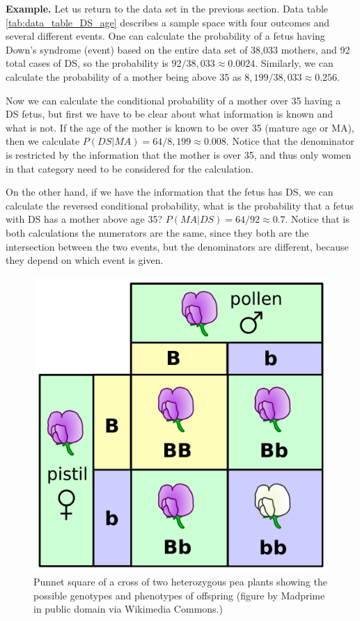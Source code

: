 \documentclass[
  letterpaper,
  DIV=11,
  numbers=noendperiod]{scrreprt}
\begin{document}
\textbf{Example.} Let us return to the data set in the previous section.
Data table \ref{tab:data_table_DS_age} describes a sample space with
four outcomes and several different events. One can calculate the
probability of a fetus having Down's syndrome (event) based on the
entire data set of 38,033 mothers, and 92 total cases of DS, so the
probability is \(92/38,033 \approx 0.0024\). Similarly, we can calculate
the probability of a mother being above 35 as
\(8,199/ 38,033 \approx 0.256\).

Now we can calculate the conditional probability of a mother over 35
having a DS fetus, but first we have to be clear about what information
is known and what is not. If the age of the mother is known to be over
35 (mature age or MA), then we calculate
\(P(DS | MA) = 64/8,199 \approx 0.008\). Notice that the denominator is
restricted by the information that the mother is over 35, and thus only
women in that category need to be considered for the calculation.

On the other hand, if we have the information that the fetus has DS, we
can calculate the reversed conditional probability, what is the
probability that a fetus with DS has a mother above age 35?
\(P(MA | DS) = 64/92 \approx 0.7\). Notice that is both calculations the
numerators are the same, since they both are the intersection between
the two events, but the denominators are different, because they depend
on which event is given.

\begin{figure}

{\centering \includegraphics{./ch6/mendel_flowers.png}

}

\caption{Punnet square of a cross of two heterozygous pea plants showing
the possible genotypes and phenotypes of offspring (figure by Madprime
in public domain via Wikimedia Commons.)}

\end{figure}
\end{document}
